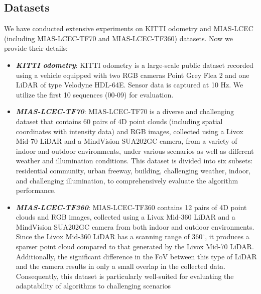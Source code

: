 \subsection{Datasets}
We have conducted extensive experiments on KITTI odometry and MIAS-LCEC (including MIAS-LCEC-TF70 and MIAS-LCEC-TF360) datasets. Now we provide their details:
\begin{itemize}
\item {\textbf{\textit{ KITTI odometry}}: KITTI odometry is a large-scale public dataset recorded using a vehicle equipped with two RGB cameras Point Grey Flea 2 and one LiDAR of type Velodyne HDL-64E. Sensor data is captured at 10 Hz. We utilize the first 10 sequences (00-09) for evaluation.}
\item {\textbf{\textit{MIAS-LCEC-TF70}}: MIAS-LCEC-TF70 is a diverse and challenging dataset that contains 60 pairs of 4D point clouds (including spatial coordinates with intensity data) and RGB images, collected using a Livox Mid-70 LiDAR and a MindVision SUA202GC camera, from a variety of indoor and outdoor environments, under various scenarios as well as different weather and illumination conditions. This dataset is divided into six subsets: residential community, urban freeway, building, challenging weather, indoor, and challenging illumination, to comprehensively evaluate the algorithm performance. }
\item {\textbf{\textit{MIAS-LCEC-TF360}}:  MIAS-LCEC-TF360 contains 12 pairs of 4D point clouds and RGB images, collected using a Livox Mid-360 LiDAR and a MindVision SUA202GC camera from both indoor and outdoor environments. Since the Livox Mid-360 LiDAR has a scanning range of 360$^\circ$,  it produces a sparser point cloud compared to that generated by the Livox Mid-70 LiDAR. Additionally, the significant difference in the FoV between this type of LiDAR and the camera results in only a small overlap in the collected data. Consequently, this dataset is particularly well-suited for evaluating the adaptability of algorithms to challenging scenarios }
\end{itemize}

